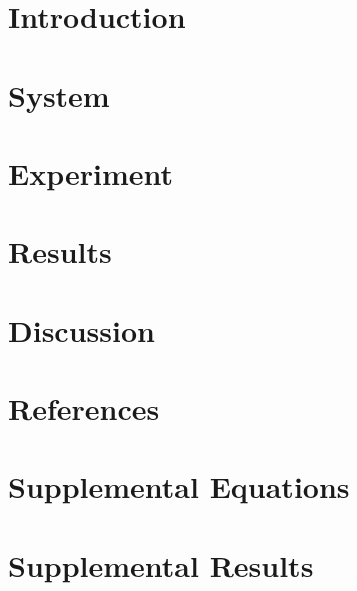 \documentclass[review,3p,authoryear]{elsarticle}
\begin{document}

\clearpage
\section{Introduction}\label{s:intro}

\section{System}\label{s:system}

\section{Experiment}\label{s:exp}

\section{Results}\label{s:results}

\section{Discussion}\label{s:discussion}

%
\clearpage
\section*{References}

\clearpage
\appendix\initappendix
\section{Supplemental Equations}\label{a:eqs}

\clearpage
\section{Supplemental Results}\label{a:results}

\clearpage
\end{document}
